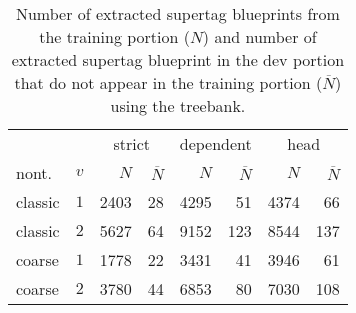 \documentclass[../../document.tex]{subfiles}
\begin{document}
    \begin{table}
        \caption{\label{tbl:experiments:dptb:size}
        Number of extracted supertag blueprints from the training portion ($N$) and number of extracted supertag blueprint in the dev portion that do not appear in the training portion ($\overline{N}$) using the \dptb{} treebank.
        }
        \centering
        \setlength{\tabcolsep}{4pt}
        \vspace{.2cm}
        \begin{tabular}{lc|rr|rr|rr}
            \toprule
             &        & \multicolumn{2}{c|}{strict} & \multicolumn{2}{c|}{dependent} & \multicolumn{2}{c}{head}  \\
 nont.   &\(v\)   & $N$ & $\overline{N}$ & $N$ & $\overline{N}$ & $N$ & $\overline{N}$ \\ \hline
  classic & \(1\)  & 2403 &  28 &  4295 &  51 &  4374 &  66  \\
  classic & \(2\)  & 5627 &  64 &  9152 & 123 &  8544 & 137  \\
  coarse  & \(1\)  & 1778 &  22 &  3431 &  41 &  3946 &  61  \\
  coarse  & \(2\)  & 3780 &  44 &  6853 &  80 &  7030 & 108  \\
    \bottomrule
        \end{tabular}
    \end{table}
\end{document}
